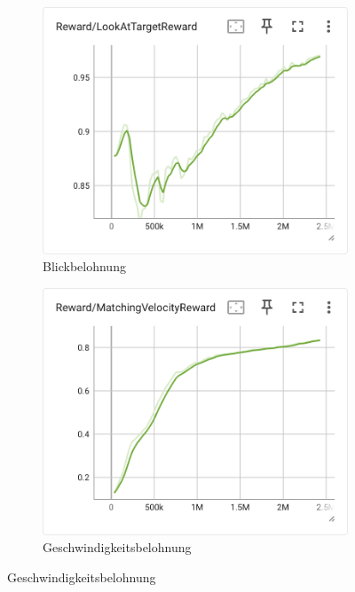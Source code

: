 \begin{figure}[H]
\begin{subfigure}{.49\textwidth}
    \end{subfigure}
     \begin{subfigure}{.49\textwidth}
      \centering  
      \includegraphics[width=\textwidth]{img/126_look_reward}
      \caption{Blickbelohnung}
      \label{fig:126_look_reward}
    \end{subfigure}
    \begin{subfigure}{.49\textwidth}
      \centering  
      \includegraphics[width=\textwidth]{img/126_vel_reward}
      \caption{Geschwindigkeitsbelohnung}
      \label{fig:126_vel_reward}
    \end{subfigure}

\end{figure}
